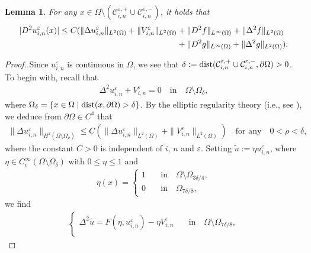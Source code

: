 \documentclass[12pt]{amsart}
\newtheorem{lem}{Lemma}[section]
\begin{document}
\begin{lem} \label{D2-bdd-lem-1}
For any $x \in \Omega \setminus ({\mathcal{C}}^{{\varepsilon},+}_{i,n} \cup {\mathcal{C}}^{{\varepsilon},-}_{i,n})$, it holds that 
\begin{align*}
| D^{2} u^{\varepsilon}_{i,n}(x) | \le C ( \| \Delta u^{\varepsilon}_{i,n} \|_{L^{2}(\Omega)} + \| V^{\varepsilon}_{i,n} \|_{L^{2}(\Omega)} 
  & + \| D^{2} f \|_{L^{\infty}(\Omega)} + \| \Delta^{2} f \|_{L^{2}(\Omega)} \\ 
  & + \| D^{2} g \|_{L^{\infty}(\Omega)} + \| \Delta^{2} g \|_{L^{2}(\Omega)}). \notag
\end{align*}
\end{lem}
\begin{proof}
Since $u^{\varepsilon}_{i,n}$ is continuous in $\Omega$, we see that ${\delta}:={\rm dist}({\mathcal{C}}^{{\varepsilon},+}_{i,n} \cup {\mathcal{C}}^{{\varepsilon},-}_{i,n}, {\partial} \Omega) > 0$. 
To begin with, recall that 
\begin{align*}
\Delta^{2} u^{\varepsilon}_{i,n} + V^{\varepsilon}_{i,n} =0 \quad \text{in} \quad \Omega \setminus \Omega_{\delta}, 
\end{align*}
where $\Omega_{\delta}= \{ x \in \Omega \mid {\rm dist}(x, {\partial} \Omega) > {\delta} \}$. 
By the elliptic regularity theory (i.e., see \cite{GT}), we deduce from ${\partial} \Omega \in C^{4}$ that 
\begin{align} \label{Delta-H2-in}
\| \Delta u^{\varepsilon}_{i,n} \|_{H^{2}(\Omega \setminus \Omega_{\rho})} 
\le C (\| \Delta u^{\varepsilon}_{i,n} \|_{L^{2}(\Omega)} + \| V^{\varepsilon}_{i,n} \|_{L^{2}(\Omega)})
\quad \text{for any} \quad 0 < \rho < {\delta}, 
\end{align}
where the constant $C>0$ is independent of $i$, $n$ and ${\varepsilon}$. 
Setting $\tilde{u}:= \eta u^{\varepsilon}_{i,n}$, where $\eta \in C^{\infty}_{c}(\Omega \setminus \Omega_{\delta})$ with $0 \le \eta \le 1$ and 
\begin{align*}
\eta(x)= 
\begin{cases}
1 \quad & \text{in} \quad \Omega \setminus \Omega_{3{\delta}/4}, \\
0 \quad & \text{in} \quad \Omega_{7{\delta}/8}, 
\end{cases}
\end{align*}
we find 
\begin{align*}
\begin{cases}
\Delta^{2} \tilde{u} = F(\eta,u^{\varepsilon}_{i,n}) - \eta V^{\varepsilon}_{i,n} \quad & \text{in} \quad \Omega \setminus \Omega_{7{\delta}/8}, \\

\end{cases}
\end{align*}
\end{proof}
\end{document}
